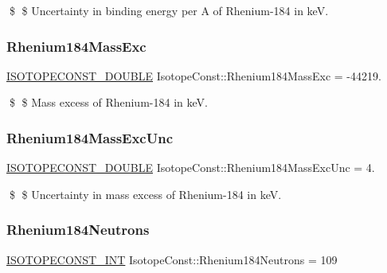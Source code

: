 \$ \$ Uncertainty in binding energy per A of Rhenium-\/184 in keV. \mbox{\label{group___isotope_const-_rhenium-_re184_ga8baf0e5944c430e2905053bf2846f20c}} 
\subsubsection{\texorpdfstring{Rhenium184\+Mass\+Exc}{Rhenium184MassExc}}
{\footnotesize\ttfamily \mbox{\hyperlink{group___isotope_const-_macros_ga8f45a7272ce02c0b4c65c44636ed719a}{I\+S\+O\+T\+O\+P\+E\+C\+O\+N\+S\+T\+\_\+\+D\+O\+U\+B\+LE}} Isotope\+Const\+::\+Rhenium184\+Mass\+Exc = -\/44219.}

\$ \$ Mass excess of Rhenium-\/184 in keV. \mbox{\label{group___isotope_const-_rhenium-_re184_gad9b5748efcef1ceaf2283848fce3d7cc}} 
\subsubsection{\texorpdfstring{Rhenium184\+Mass\+Exc\+Unc}{Rhenium184MassExcUnc}}
{\footnotesize\ttfamily \mbox{\hyperlink{group___isotope_const-_macros_ga8f45a7272ce02c0b4c65c44636ed719a}{I\+S\+O\+T\+O\+P\+E\+C\+O\+N\+S\+T\+\_\+\+D\+O\+U\+B\+LE}} Isotope\+Const\+::\+Rhenium184\+Mass\+Exc\+Unc = 4.}

\$ \$ Uncertainty in mass excess of Rhenium-\/184 in keV. \mbox{\label{group___isotope_const-_rhenium-_re184_ga44e5f9c2bb31f12c5399765646eb90a8}} 
\subsubsection{\texorpdfstring{Rhenium184\+Neutrons}{Rhenium184Neutrons}}
{\footnotesize\ttfamily \mbox{\hyperlink{group___isotope_const-_macros_ga5f18360b3e99483a35c32d789e62621c}{I\+S\+O\+T\+O\+P\+E\+C\+O\+N\+S\+T\+\_\+\+I\+NT}} Isotope\+Const\+::\+Rhenium184\+Neutrons = 109}

